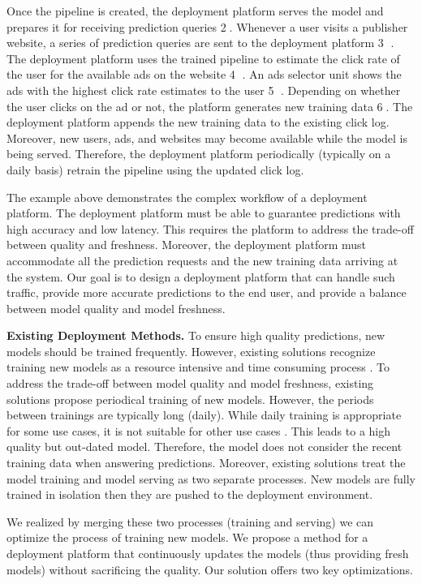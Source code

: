 Once the pipeline is created, the deployment platform serves the model and prepares it for receiving prediction queries \textcircled{2}.
Whenever a user visits a publisher website, a series of prediction queries are sent to the deployment platform \textcircled{3} .
The deployment platform uses the trained pipeline to estimate the click rate of the user for the available ads on the website \textcircled{4} .
An ads selector unit shows the ads with the highest click rate estimates to the user \textcircled{5} .
Depending on whether the user clicks on the ad or not, the platform generates new training data \textcircled{6}.
The deployment platform appends the new training data to the existing click log.
Moreover, new users, ads, and websites may become available while the model is being served.
Therefore, the deployment platform periodically (typically on a daily basis) retrain the pipeline using the updated click log.

The example above demonstrates the complex workflow of a deployment platform.
The deployment platform must be able to guarantee predictions with high accuracy and low latency.
This requires the platform to address the trade-off between quality and freshness.
Moreover, the deployment platform must accommodate all the prediction requests and the new training data arriving at the system. 
Our goal is to design a deployment platform that can handle such traffic, provide more accurate predictions to the end user, and provide a balance between model quality and model freshness.

\textbf{Existing Deployment Methods.} 
To ensure high quality predictions, new models should be trained frequently.
However, existing solutions recognize training new models as a resource intensive and time consuming process \cite{crankshaw2014missing, agarwal2014laser, baylor2017tfx}.
To address the trade-off between model quality and model freshness, existing solutions propose periodical training of new models.
However, the periods between trainings are typically long (daily).
While daily training is appropriate for some use cases, it is not suitable for other use cases \cite{baylor2017tfx}.
This leads to a high quality but out-dated model.
Therefore, the model does not consider the recent training data when answering predictions.
Moreover, existing solutions treat the model training and model serving as two separate processes. 
New models are fully trained in isolation then they are pushed to the deployment environment.

We realized by merging these two processes (training and serving) we can optimize the process of training new models.
We propose a method for a deployment platform that continuously updates the models (thus providing fresh models) without sacrificing the quality.
Our solution offers two key optimizations.

